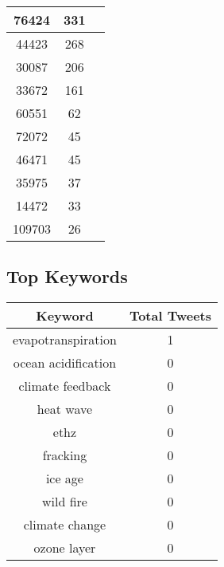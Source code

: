 \documentclass{article}\usepackage[T1]{fontenc}
\begin{document}
\begin{tabular}{|c|c|c|}
 \hline
76424 & 331\\ 
 \hline
44423 & 268\\ 
 \hline
30087 & 206\\ 
 \hline
33672 & 161\\ 
 \hline
60551 & 62\\ 
 \hline
72072 & 45\\ 
 \hline
46471 & 45\\ 
 \hline
35975 & 37\\ 
 \hline
14472 & 33\\ 
 \hline
109703 & 26\\ 
 \hline
\end{tabular}\subsection*{Top Keywords}\begin{tabular}{|c|c|}         \hline         Keyword & Total Tweets \\ 
 \hline
evapotranspiration & 1\\ 
 \hline
ocean acidification & 0\\ 
 \hline
climate feedback & 0\\ 
 \hline
heat wave & 0\\ 
 \hline
ethz & 0\\ 
 \hline
fracking & 0\\ 
 \hline
ice age & 0\\ 
 \hline
wild fire & 0\\ 
 \hline
climate change & 0\\ 
 \hline
ozone layer & 0\\ 
 \hline
\end{tabular}
\end{document}
